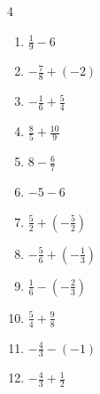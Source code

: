 \begin{multicols}{4}
\begin{enumerate}
        \phantom{$\displaystyle =-15$}

  \item $\displaystyle \frac{1}{9} - 6$


  \item $\displaystyle -\frac{7}{8} + \left(-2\right)$


  \item $\displaystyle -\frac{1}{6} + \frac{5}{4}$


  \item $\displaystyle \frac{8}{5} + \frac{10}{9}$


  \item $\displaystyle 8 - \frac{6}{7}$


  \item $\displaystyle -5 - 6$

        \phantom{$\displaystyle =-11$}

  \item $\displaystyle \frac{5}{2} + \left(-\frac{5}{2}\right)$

        \phantom{$\displaystyle =0$}

  \item $\displaystyle -\frac{5}{6} + \left(-\frac{1}{3}\right)$


\columnbreak %

  \item $\displaystyle \frac{1}{6} - \left(-\frac{2}{3}\right)$


  \item $\displaystyle \frac{5}{4} + \frac{9}{8}$


  \item $\displaystyle -\frac{4}{3} - \left(-1\right)$


  \item $\displaystyle -\frac{4}{3} + \frac{1}{2}$


\end{enumerate}
\end{multicols}
